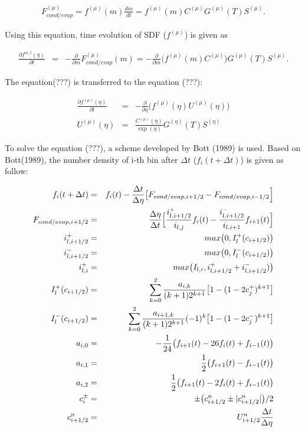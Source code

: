 \begin{eqnarray}
F^{(\mu)}_{cond/evap}=f^{(\mu)}(m)\frac{dm}{dt}=f^{(\mu)}(m)C^{(\mu)}G^{(\mu)}(T)S^{(\mu)}.
\end{eqnarray}

Using this equation, time evolution of SDF ($f^{(\mu)}$) is given as

\begin{eqnarray}
\frac{\partial f^{m,t}(\eta)}{\partial t}&=&-\frac{\partial}{\partial m}F^{(\mu)}_{cond/evap}(m)=-\frac{\partial}{\partial m}\bigl (f^{(\mu)}(m)C^{(\mu)}\bigr ) G^{(\mu)}(T)S^{(\mu)}.
\end{eqnarray}


The equation(???) is transferred to the equation (???):

\begin{eqnarray}
\frac{\partial f^{(\mu)}(\eta)}{\partial t}&=&-\frac{\partial}{\partial \eta}\bigl ( f^{(\mu)}(\eta)U^{(\mu)}(\eta)\bigr)\\
U^{(\mu)}(\eta)&=&\frac{C^{(\mu)}(\eta)}{\exp (\eta)}G^{(\eta)}(T)S^{(\eta)}\nonumber
\end{eqnarray}

To solve the equation (???), a scheme developed by Bott (1989) is used. Based on Bott(1989), the number density of i-th bin after $\Delta t$ ($f_{i}(t+\Delta t)$) is given as follow:

\begin{eqnarray}
f_{i}(t+\Delta t)&=&f_{i}(t)-\frac{\Delta t}{\Delta \eta}\bigl [F_{cond/evap,i+1/2}-F_{cond/evap,i-1/2}\Bigr ]\nonumber\\
F_{cond/evap,i+1/2}&=&\frac{\Delta \eta}{\Delta t}\Bigl[ \frac{i^{+}_{l,i+1/2}}{i_{l,j}}f_{i}(t)-\frac{i^{-}_{l,i+1/2}}{i_{l,i+1}}f_{i+1}(t)\Bigr ]\nonumber\\
i^{+}_{l,i+1/2}&=&max\bigl(0,I^{+}_{l}(c_{i+1/2})\bigr)\nonumber\\
i^{-}_{l,i+1/2}&=&max\bigl(0,I^{-}_{l}(c_{i+1/2})\bigr)\nonumber\\
i^{+}_{l,i}&=&max\bigl(I_{l,i},i^{+}_{l,i+1/2}+i^{-}_{l,i+1/2})\bigr)\nonumber\\
I^{+}_{l}(c_{i+1/2})&=&\sum_{k=0}^{2}\frac{a_{i,k}}{(k+1)2^{k+1}}\bigl[1-(1-2c^{+}_{j})^{k+1}\bigr]\nonumber\\
I^{-}_{l}(c_{i+1/2})&=&\sum_{k=0}^{2}\frac{a_{i+1,k}}{(k+1)2^{k+1}}(-1)^{k}\bigl[1-(1-2c^{-}_{j})^{k+1}\bigr]\nonumber\\
a_{i,0}&=&-\frac{1}{24}\bigl( f_{i+1}(t)-26f_{i}(t)+f_{i-1}(t) \bigr)\nonumber\\
a_{i,1}&=&\frac{1}{2}\bigl( f_{i+1}(t)-f_{i-1}(t) \bigr)\nonumber\\
a_{i,2}&=&\frac{1}{2}\bigl( f_{i+1}(t)-2f_{i}(t)+f_{i-1}(t) \bigr)\nonumber\\
c_{i}^{\pm}&=&\pm\bigl( c^{n}_{i+1/2}\pm | c^{n}_{i+1/2}|\bigr )/2\nonumber\\
c^{n}_{i+1/2}&=&U^{n}_{i+1/2}\frac{\Delta t}{\Delta \eta}
\end{eqnarray}


